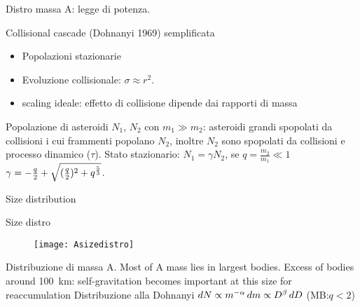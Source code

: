 \begin{wordonframe}{Distro massa A: legge di potenza.}
\begin{block}{Collisional cascade (Dohnanyi 1969) semplificata}
\begin{itemize}
\item Popolazioni stazionarie
\item Evoluzione collisionale: $\sigma\approx r^2$.
\item scaling ideale: effetto di collisione dipende dai rapporti di massa
\end{itemize}
Popolazione di asteroidi $N_1$, $N_2$ con $m_1\gg m_2$: asteroidi grandi spopolati da collisioni i cui frammenti popolano $N_2$, inoltre $N_2$ sono spopolati da collisioni e processo dinamico ($\tau$).
Stato stazionario: $N_1=\gamma N_2$, se $q=\frac{m_2}{m_1}\ll1$ $\gamma=-\frac{q}{2}+\sqrt{(\frac{q}{2})^2+q^{\frac{5}{3}}}$.
\end{block}
\end{wordonframe}

\begin{frame}{Size distribution}
\begin{block}{Size distro}
\begin{figure}[!ht]\texttt{[image: Asizedistro]}
\end{figure}
\end{block}
\end{frame}

\begin{wordonframe}{Distribuzione di massa A.}
Most of A mass lies in largest bodies. Excess of bodies around \SI{100}{\kilo\meter}: self-gravitation becomes important at this size for reaccumulation
Distribuzione alla Dohnanyi  $dN\propto m^{-\alpha}\,dm\propto D^{\beta}\,dD$ (MB:$q<2$)
\end{wordonframe}

